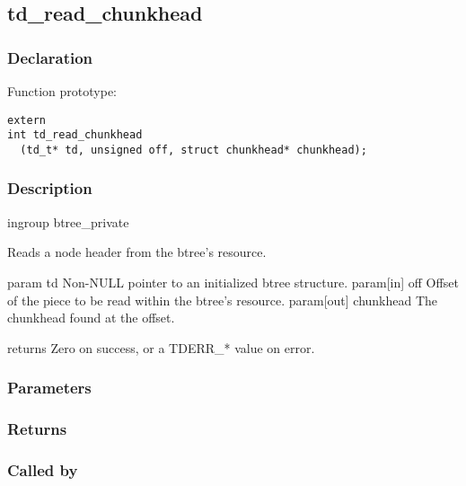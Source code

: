 
\newpage
\subsection{td\_read\_chunkhead}
\subsubsection{Declaration} Function prototype:

\begin{verbatim}
extern
int td_read_chunkhead
  (td_t* td, unsigned off, struct chunkhead* chunkhead);
\end{verbatim}

\subsubsection{Description}


 ingroup btree\_private

 Reads a node header from the btree's resource.

 param td Non-NULL pointer to an initialized btree structure.
 param[in] off Offset of the piece to be read within the btree's resource.
 param[out] chunkhead The chunkhead found at the offset.

 returns Zero on success, or a TDERR\_* value on error.
 

\subsubsection{Parameters}
\subsubsection{Returns}
\subsubsection{Called by}
